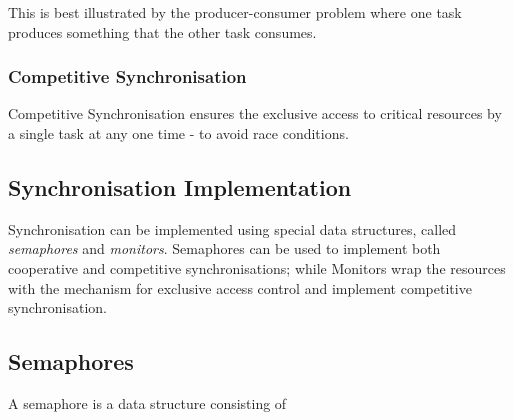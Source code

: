 This is best illustrated by the producer-consumer problem where one task produces something that the other task consumes. 

\subsubsection{Competitive Synchronisation}
Competitive Synchronisation ensures the exclusive access to critical resources by a single task at any one time - to avoid race conditions.

\subsection{Synchronisation Implementation}
Synchronisation can be implemented using special data structures, called \textit{semaphores} and \textit{monitors}. Semaphores can be used to implement both cooperative and competitive synchronisations; while Monitors wrap the resources with the mechanism for exclusive access control and implement competitive synchronisation. 

\subsection{Semaphores}
A semaphore is a data structure consisting of